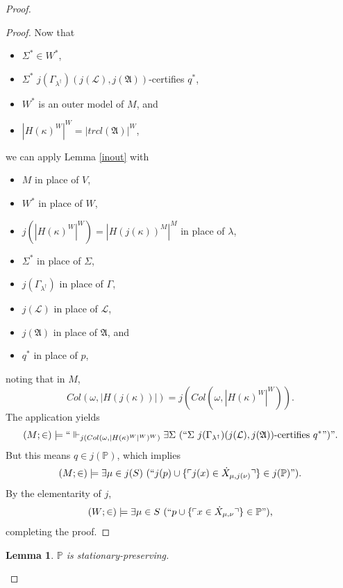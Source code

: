 \documentclass[12pt, twoside]{memoir}
\numberwithin{equation}{section}
\newtheorem{lem}[thm]{Lemma}
\theoremstyle{definition}
\theoremstyle{remark}
\theoremstyle{definition}
\theoremstyle{definition}
\theoremstyle{definition}
\theoremstyle{remark}
\begin{document}
\begin{proof}
\begin{proof}
Now that 
\begin{itemize}
    \item $\Sigma^* \in W^*$,
    \item $\Sigma^*$ $j(\Gamma_{\lambda^{\dagger}})(j(\mathcal{L}), j(\mathfrak{A}))$-certifies $q^*$,
    \item $W^*$ is an outer model of $M$, and
    \item $|H(\kappa)^W|^W = |trcl(\mathfrak{A})|^W$,
\end{itemize} 
we can apply Lemma \ref{inout} with 
\begin{itemize}
    \item $M$ in place of $V$,
    \item $W^*$ in place of $W$,
    \item $j(|H(\kappa)^W|^W) = |H(j(\kappa))^M|^M$ in place of $\lambda$,
    \item $\Sigma^*$ in place of $\Sigma$,
    \item $j(\Gamma_{\lambda^{\dagger}})$ in place of $\Gamma$,
    \item $j(\mathcal{L})$ in place of $\mathcal{L}$,
    \item $j(\mathfrak{A})$ in place of $\mathfrak{A}$, and
    \item $q^*$ in place of $p$,
\end{itemize}
noting that in $M$, $$Col(\omega, |H(j(\kappa))|) = j(Col(\omega, |H(\kappa)^W|^W)).$$ The application yields $$(M; \in) \models ``\Vdash_{j(Col(\omega, |H(\kappa)^W|^W)^W)} \exists \Sigma \ (``\Sigma \ j(\Gamma_{\lambda^{\dagger}})(j(\mathcal{L}), j(\mathfrak{A})) \text{-certifies } q^*")".$$ But this means $q \in j(\mathbb{P})$, which implies $$(M; \in) \models \exists \mu \in j(S) \ (``j(p) \cup \{\ulcorner j(x) \in \dot{X}_{\mu, j(\nu)} \urcorner\} \in j(\mathbb{P})") \text{.}$$ By the elementarity of $j$, $$(W; \in) \models \exists \mu \in S \ (``p \cup \{\ulcorner x \in \dot{X}_{\mu, \nu} \urcorner\} \in \mathbb{P}") \text{,}$$ completing the proof.
\end{proof}

\begin{lem}\label{statdone}
$\mathbb{P}$ is stationary-preserving.
\end{lem}


\end{proof}
\end{document}
